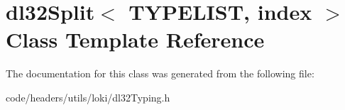 \hypertarget{classdl32_split}{\section{dl32\-Split$<$ T\-Y\-P\-E\-L\-I\-S\-T, index $>$ Class Template Reference}
\label{classdl32_split}
}


The documentation for this class was generated from the following file\-:\begin{DoxyCompactItemize}
\item 
code/headers/utils/loki/dl32\-Typing.\-h\end{DoxyCompactItemize}
